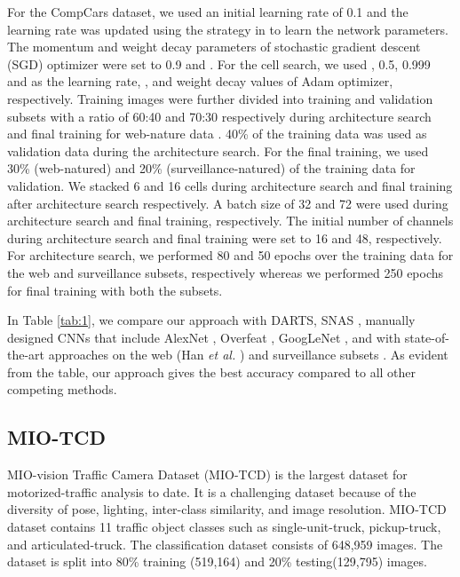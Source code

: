 \documentclass[10pt,a4paper,conference]{IEEEtran}
\begin{document}
For the CompCars dataset, we used an initial learning rate of 0.1 and the learning rate was updated using the strategy in \cite{Loshchilov2017SGDRSG:22} to learn the network parameters. The momentum and weight decay parameters of stochastic gradient descent (SGD) optimizer were set to 0.9 and . For the cell search, we used , 0.5, 0.999 and  as the learning rate, ,  and weight decay values of Adam optimizer, respectively. Training images were further divided into training and validation subsets with a ratio of 60:40 and 70:30 respectively during architecture search and final training for web-nature data . 40\% of the training data was used as validation data during the architecture search. For the final training, we used 30\% (web-natured) and 20\% (surveillance-natured) of the training data for validation. We stacked 6 and 16 cells during architecture search and final training after architecture search respectively. A batch size of 32 and 72 were used during architecture search and final training, respectively. The initial number of channels during architecture search and final training were set to 16 and 48, respectively. For architecture search, we performed 80 and 50 epochs over the training data for the web and surveillance subsets, respectively whereas we performed 250 epochs for final training with both the subsets.

In Table \ref{tab:1}, we compare our approach  with DARTS\cite{liu2018darts:6}, SNAS \cite{xie2018snas:4}, manually designed CNNs that include AlexNet \cite{DBLP:journals/corr/YangLLT15:3} , Overfeat \cite{DBLP:journals/corr/YangLLT15:3}, GoogLeNet \cite{DBLP:journals/corr/YangLLT15:3}, and with state-of-the-art approaches on the web (Han \textit{et al.} \cite{Han:2018:AAM:3240508.3240550:28}) and surveillance subsets \cite{Fang2017FineGrainedVM:27}. As evident from the table, our approach gives the best accuracy compared to all other competing methods.

\subsection{MIO-TCD}
MIO-vision Traffic Camera Dataset (MIO-TCD) \cite{8387876:4} is the largest dataset for motorized-traffic analysis to date.  It is a challenging dataset because of the diversity of pose, lighting, inter-class similarity, and image resolution. MIO-TCD dataset contains 11 traffic object classes such as single-unit-truck, pickup-truck, and articulated-truck. The classification dataset consists of 648,959 images. The dataset is split into 80\% training (519,164) and 20\% testing(129,795) images.
\end{document}
